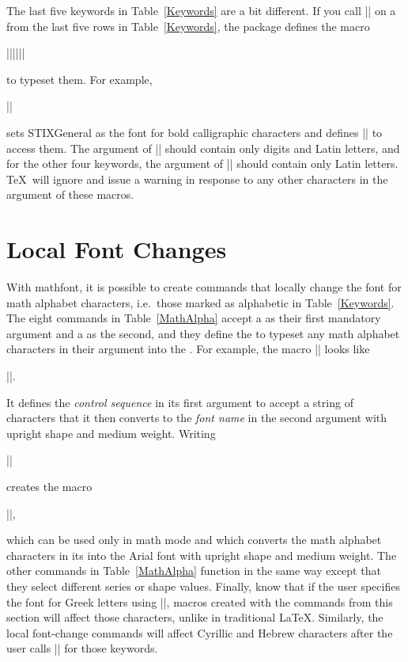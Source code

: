 \documentclass[12pt,twoside]{article}
\begin{document}
The last five keywords in Table~\ref{Keywords} are a bit different. If you call |\mathfont| on a  from the last five rows in Table~\ref{Keywords}, the package defines the macro
\begin{code}
|\math||{||}|
\end{code}
to typeset them. For example,
\begin{code}
||
\end{code}
sets STIXGeneral as the font for bold calligraphic characters and defines |\mathbb| to access them. The argument of |\mathbb| should contain only digits and Latin letters, and for the other four keywords, the argument of |\math| should contain only Latin letters. \TeX\ will ignore and issue a warning in response to any other characters in the argument of these macros.

\section{Local Font Changes}

With \textsf{mathfont}, it is possible to create commands that locally change the font for math alphabet characters, i.e.\ those marked as alphabetic in Table~\ref{Keywords}. The eight commands in Table~\ref{MathAlpha} accept a  as their first mandatory argument and a  as the second, and they define the  to typeset any math alphabet characters in their argument into the . For example, the macro |\newmathrm| looks like
\begin{code}
||.
\end{code}
It defines the \textit{control sequence} in its first argument to accept a string of characters that it then converts to the \textit{font name} in the second argument with upright shape and medium weight. Writing
\begin{code}
||
\end{code}
creates the macro
\begin{code}
||,
\end{code}
which can be used only in math mode and which converts the math alphabet characters in its  into the Arial font with upright shape and medium weight. The other commands in Table~\ref{MathAlpha} function in the same way except that they select different series or shape values. Finally, know that if the user specifies the font for Greek letters using |\mathfont|, macros created with the commands from this section will affect those characters, unlike in traditional \LaTeX. Similarly, the local font-change commands will affect Cyrillic and Hebrew characters after the user calls |\mathfont| for those keywords.
\end{document}
